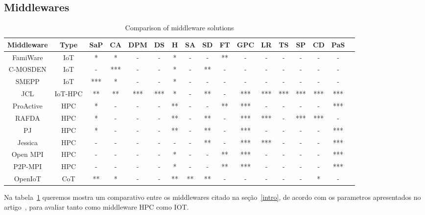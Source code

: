 \documentclass[12pt]{article}
\begin{document}
\subsection{Middlewares}
\begin{table}
  \caption{Comparison of middleware solutions}
  \label{tab:middlewares}
  \tiny
  \begin{tabular}{ccccccccccccccccl}
    \toprule
   Middleware & Type & SaP & CA & DPM & DS & H & SA & SD & FT & GPC & LR & TS & SP & CD & PaS\\
    \midrule
    FamiWare & IoT & * & * & - & - & * & - & - & ** & - & - & - & - & - & -\\
    C-MOSDEN & IoT & - & *** & - & - & * & - & ** & - & - & - & - & - & - & -\\ 
    SMEPP & IoT & *** & * & - & - & * & - & - & - & - & - & - & - & - & -\\ 
    JCL & IoT-HPC & ** & ** & *** & *** & * & - & ** & - & *** & *** & *** & *** & *** & ***\\
    ProActive & HPC & * & - & - & - & ** & - & - & ** & *** & - & - & - & - & *** \\ 
    RAFDA & HPC & * & - & - & - & ** & - & ** & - & *** & *** & - & *** & *** & -\\ 
    PJ & HPC & * & - & - & - & ** & - & ** & - & *** & - & - & - & - & ***\\ 
    Jessica & HPC & - & - & - & - & - & - & ** & - & *** & *** & - & - & - & ***\\ 
    Open MPI & HPC & - & - & - & - & * & - & - & ** & *** & - & - & - & - & ***\\ 
    P2P-MPI & HPC & - & - & - & - & * & - & - & ** & *** & - & - & - & - & ***\\ 
    OpenIoT & CoT & ** & * & - & - & ** & ** & ** & - & - & - & - & - & * & -\\ 
    \bottomrule
  \end{tabular}
\end{table}

Na tabela~\ref{tab:middlewares} queremos mostra um comparativo entre os middlewares citado na seção~\ref{intro}, de acordo com os parametros apresentados no artigo~\cite{Cimino2017}, para avaliar tanto como middleware HPC como IOT.
\end{document}
